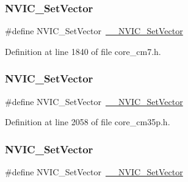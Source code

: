 \subsubsection{\texorpdfstring{N\+V\+I\+C\+\_\+\+Set\+Vector}{NVIC\_SetVector}\hspace{0.1cm}{\footnotesize\ttfamily [10/13]}}
{\footnotesize\ttfamily \#define N\+V\+I\+C\+\_\+\+Set\+Vector~\hyperlink{group___c_m_s_i_s___core___n_v_i_c_functions_ga0df355460bc1783d58f9d72ee4884208}{\+\_\+\+\_\+\+N\+V\+I\+C\+\_\+\+Set\+Vector}}



Definition at line 1840 of file core\+\_\+cm7.\+h.

\mbox{\label{group___c_m_s_i_s___core___n_v_i_c_functions_ga804af63bb4c4c317387897431814775d}} 
\subsubsection{\texorpdfstring{N\+V\+I\+C\+\_\+\+Set\+Vector}{NVIC\_SetVector}\hspace{0.1cm}{\footnotesize\ttfamily [11/13]}}
{\footnotesize\ttfamily \#define N\+V\+I\+C\+\_\+\+Set\+Vector~\hyperlink{group___c_m_s_i_s___core___n_v_i_c_functions_ga0df355460bc1783d58f9d72ee4884208}{\+\_\+\+\_\+\+N\+V\+I\+C\+\_\+\+Set\+Vector}}



Definition at line 2058 of file core\+\_\+cm35p.\+h.

\mbox{\label{group___c_m_s_i_s___core___n_v_i_c_functions_ga804af63bb4c4c317387897431814775d}} 
\subsubsection{\texorpdfstring{N\+V\+I\+C\+\_\+\+Set\+Vector}{NVIC\_SetVector}\hspace{0.1cm}{\footnotesize\ttfamily [12/13]}}
{\footnotesize\ttfamily \#define N\+V\+I\+C\+\_\+\+Set\+Vector~\hyperlink{group___c_m_s_i_s___core___n_v_i_c_functions_ga0df355460bc1783d58f9d72ee4884208}{\+\_\+\+\_\+\+N\+V\+I\+C\+\_\+\+Set\+Vector}}



